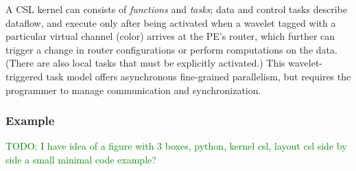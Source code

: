\documentclass[sigconf]{acmart}
\begin{document}
    A CSL kernel can consists of \textit{functions} and \textit{tasks}; data and control tasks describe dataflow, and execute only after being activated %
    when a wavelet tagged with a particular virtual channel (color) arrives at the PE’s router, which further can trigger a change in router configurations or perform computations on the data. %
    (There are also local tasks that must be explicitly activated.) This wavelet-triggered task model offers %
    asynchronous fine-grained parallelism, but requires the programmer to manage communication and synchronization. %
    
\subsubsection{Example}
\textcolor{green}{TODO: I have idea of a figure with 3 boxes, python, kernel csl, layout csl side by side a small minimal code example?}
\end{document}

